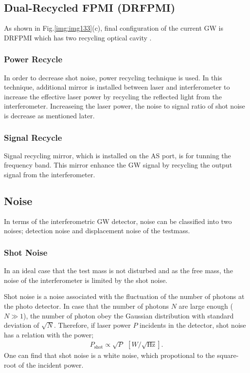 \subsection{Dual-Recycled FPMI (DRFPMI)}
As shown in Fig.\ref{img:img133}(c), final configuration of the current GW is DRFPMI which has two recycling optical cavity \cite{meers1988recycling}.

\subsubsection{Power Recycle}
In order to decrease shot noise, power recycling technique is used. In this technique, additional mirror is installed between laser and interferometer to increase the effective laser power by recycling the reflected light from the interferometer. Increaseing the laser power, the noise to signal ratio of shot noise is decrease as mentioned later.

\subsubsection{Signal Recycle}
Signal recycling mirror, which is installed on the AS port, is for tunning the frequency band. This mirror enhance the GW signal by recycling the output signal from the interferometer.

\subsection{Noise}
In terms of the interferometric GW detector, noise can be classified into two noises; detection noise and displacement noise of the testmass.

\subsubsection{Shot Noise}
In an ideal case that the test mass is not disturbed and as the free mass, the noise of the interferometer is limited by the shot noise.

Shot noise is a noise associated with the fluctuation of the number of photons at the photo detector. In case that the number of photons $N$ are large enough ($N\gg1$), the number of photon obey the Gaussian distribution with standard deviation of $\sqrt{N}$. Therefore, if laser power $P$ incidents in the detector, shot noise has a relation with the power;
\begin{eqnarray}
  P_{\mathrm{shot}} \propto \sqrt{P}\ \ [W/\sqrt{\mathrm{Hz}}].  \label{eq:eq136}
\end{eqnarray}
One can find that shot noise is a white noise, which propotional to the square-root of the incident power.

